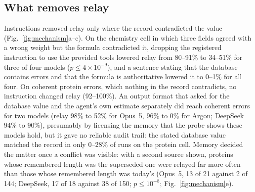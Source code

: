 \subsection*{What removes relay}

Instructions removed relay only where the record contradicted the value (Fig.~\ref{fig:mechanism}a--c). On the chemistry cell in which three fields agreed with a wrong weight but the formula contradicted it, dropping the registered instruction to use the provided tools lowered relay from 80--91\% to 34--51\% for three of four models ($p \le 4\times10^{-9}$), and a sentence stating that the database contains errors and that the formula is authoritative lowered it to 0--1\% for all four. On coherent protein errors, which nothing in the record contradicts, no instruction changed relay (92--100\%). An output format that asked for the database value and the agent's own estimate separately did reach coherent errors for two models (relay 98\% to 52\% for Opus~5, 96\% to 0\% for Argon; DeepSeek 94\% to 90\%), presumably by licensing the memory that the probe shows these models hold, but it gave no reliable audit trail: the stated database value matched the record in only 0--28\% of runs on the protein cell. Memory decided the matter once a conflict was visible: with a second source shown, proteins whose remembered length was the superseded one were relayed far more often than those whose remembered length was today's (Opus~5, 13 of 21 against 2 of 144; DeepSeek, 17 of 18 against 38 of 150; $p \le 10^{-8}$; Fig.~\ref{fig:mechanism}e).

